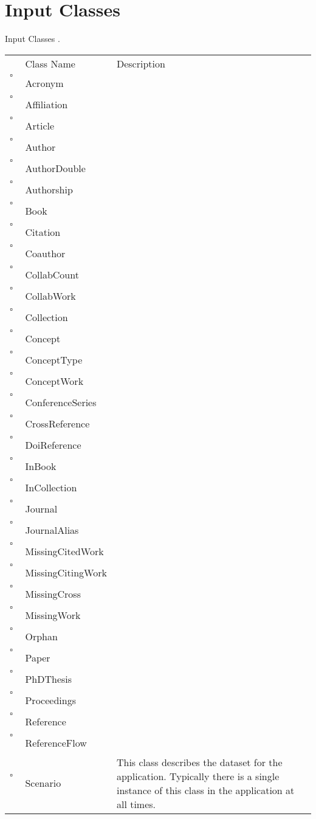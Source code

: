 \chapter{Input Classes}
Input Classes     .
\begin{longtable}{llp{8cm}}
& Class Name & Description \\
$\square$\ & Acronym &  \\
$\square$\ & Affiliation &  \\
$\square$\ & Article &  \\
$\square$\ & Author &  \\
$\square$\ & AuthorDouble &  \\
$\square$\ & Authorship &  \\
$\square$\ & Book &  \\
$\square$\ & Citation &  \\
$\square$\ & Coauthor &  \\
$\square$\ & CollabCount &  \\
$\square$\ & CollabWork &  \\
$\square$\ & Collection &  \\
$\square$\ & Concept &  \\
$\square$\ & ConceptType &  \\
$\square$\ & ConceptWork &  \\
$\square$\ & ConferenceSeries &  \\
$\square$\ & CrossReference &  \\
$\square$\ & DoiReference &  \\
$\square$\ & InBook &  \\
$\square$\ & InCollection &  \\
$\square$\ & Journal &  \\
$\square$\ & JournalAlias &  \\
$\square$\ & MissingCitedWork &  \\
$\square$\ & MissingCitingWork &  \\
$\square$\ & MissingCross &  \\
$\square$\ & MissingWork &  \\
$\square$\ & Orphan &  \\
$\square$\ & Paper &  \\
$\square$\ & PhDThesis &  \\
$\square$\ & Proceedings &  \\
$\square$\ & Reference &  \\
$\square$\ & ReferenceFlow &  \\
$\square$\ & Scenario & This class describes the dataset for the application. Typically there is a single instance of this class in the application at all times. \\

\end{longtable}
